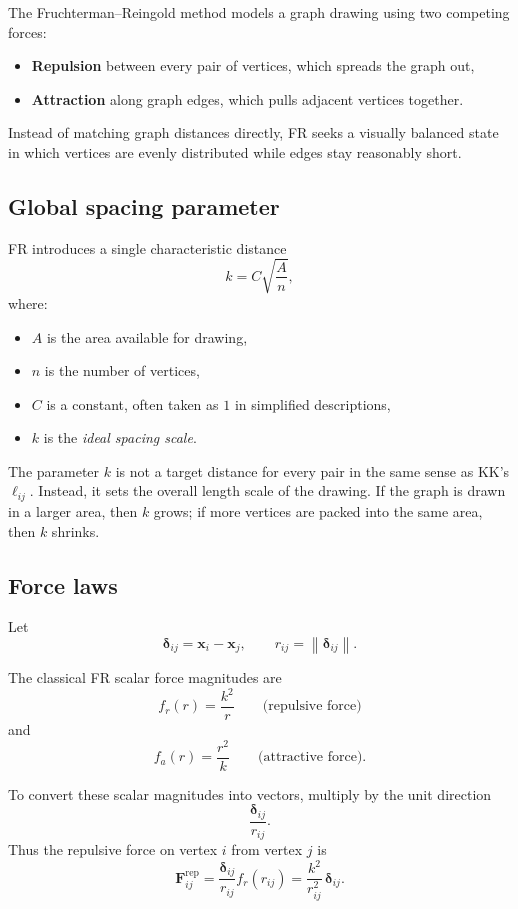 \documentclass[11pt]{article}
\newcommand{\vect}[1]{\boldsymbol{#1}}
\newcommand{\norm}[1]{\left\lVert #1 \right\rVert}
\begin{document}
The Fruchterman--Reingold method models a graph drawing using two competing
forces:
\begin{itemize}[leftmargin=1.5em]
\item \textbf{Repulsion} between every pair of vertices, which spreads the graph out,
\item \textbf{Attraction} along graph edges, which pulls adjacent vertices together.
\end{itemize}

Instead of matching graph distances directly, FR seeks a visually balanced state
in which vertices are evenly distributed while edges stay reasonably short.

\subsection{Global spacing parameter}

FR introduces a single characteristic distance
\[
k = C \sqrt{\frac{A}{n}},
\]
where:
\begin{itemize}[leftmargin=1.5em]
\item $A$ is the area available for drawing,
\item $n$ is the number of vertices,
\item $C$ is a constant, often taken as $1$ in simplified descriptions,
\item $k$ is the \emph{ideal spacing scale}.
\end{itemize}

The parameter $k$ is not a target distance for every pair in the same sense as
KK's $\ell_{ij}$. Instead, it sets the overall length scale of the drawing. If
the graph is drawn in a larger area, then $k$ grows; if more vertices are packed
into the same area, then $k$ shrinks.

\subsection{Force laws}

Let
\[
\vect{\delta}_{ij} = \vect{x}_i - \vect{x}_j,
\qquad
r_{ij} = \norm{\vect{\delta}_{ij}}.
\]

The classical FR scalar force magnitudes are
\[
f_r(r) = \frac{k^2}{r}
\qquad \text{(repulsive force)}
\]
and
\[
f_a(r) = \frac{r^2}{k}
\qquad \text{(attractive force)}.
\]

To convert these scalar magnitudes into vectors, multiply by the unit direction
\[
\frac{\vect{\delta}_{ij}}{r_{ij}}.
\]
Thus the repulsive force on vertex $i$ from vertex $j$ is
\[
\vect{F}^{\text{rep}}_{ij}
=
\frac{\vect{\delta}_{ij}}{r_{ij}} f_r(r_{ij})
=
\frac{k^2}{r_{ij}^2}\,\vect{\delta}_{ij}.
\]
\end{document}
